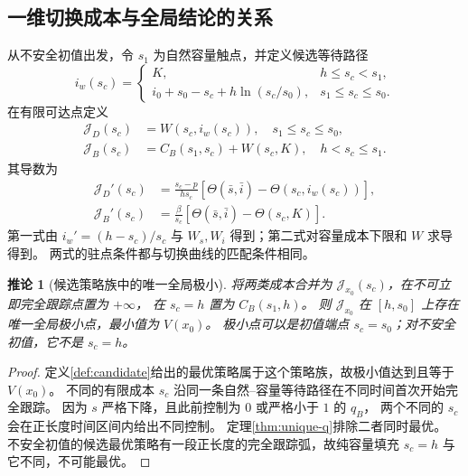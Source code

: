 \documentclass[11pt,a4paper,UTF8]{ctexart}
\newtheorem{corollary}[theorem]{推论}
\theoremstyle{definition}
\begin{document}
\subsection{一维切换成本与全局结论的关系}
\label{sec:one-dimensional}
从不安全初值出发，令 $s_1$ 为自然容量触点，并定义候选等待路径
\[
i_w(s_c)=
\begin{cases}
K,&h\le s_c<s_1,\\
i_0+s_0-s_c+h\ln(s_c/s_0),&s_1\le s_c\le s_0.
\end{cases}
\]
在有限可达点定义
\begin{align}
\mathcal J_D(s_c)&=W(s_c,i_w(s_c)),\quad s_1\le s_c\le s_0,
\label{eq:JD}\\
\mathcal J_B(s_c)&=C_B(s_1,s_c)+W(s_c,K),\quad h<s_c\le s_1.
\label{eq:JB}
\end{align}
其导数为
\begin{align}
\mathcal J_D'(s_c)&=\frac{s_c-p}{hs_c}
[\Theta(\bar s,\bar i)-\Theta(s_c,i_w(s_c))],\label{eq:JD-derivative}\\
\mathcal J_B'(s_c)&=\frac{\beta}{s_c}
[\Theta(\bar s,\bar i)-\Theta(s_c,K)].\label{eq:JB-derivative}
\end{align}
第一式由 $i_w'=(h-s_c)/s_c$ 与 $W_s,W_i$ 得到；第二式对容量成本下限和 $W$ 求导得到。
两式的驻点条件都与切换曲线的匹配条件相同。

\begin{corollary}[候选策略族中的唯一全局极小]
\label{cor:one-dimensional-min}
将两类成本合并为 $\mathcal J_{x_0}(s_c)$，在不可立即完全跟踪点置为 $+\infty$，
在 $s_c=h$ 置为 $C_B(s_1,h)$。
则 $\mathcal J_{x_0}$ 在 $[h,s_0]$ 上存在唯一全局极小点，最小值为 $V(x_0)$。
极小点可以是初值端点 $s_c=s_0$；对不安全初值，它不是 $s_c=h$。
\end{corollary}
\begin{proof}
定义\ref{def:candidate}给出的最优策略属于这个策略族，故极小值达到且等于 $V(x_0)$。
不同的有限成本 $s_c$ 沿同一条自然--容量等待路径在不同时间首次开始完全跟踪。
因为 $s$ 严格下降，且此前控制为 $0$ 或严格小于 $1$ 的 $q_B$，
两个不同的 $s_c$ 会在正长度时间区间内给出不同控制。
定理\ref{thm:unique-q}排除二者同时最优。
不安全初值的候选最优策略有一段正长度的完全跟踪弧，故纯容量填充 $s_c=h$ 与它不同，不可能最优。
\end{proof}
\end{document}
